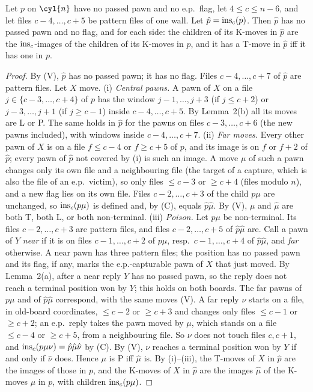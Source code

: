 \begin{wlemma}
Let $p$ on $\cyl{n}$ have no passed pawn and no e.p.\ flag, let $4\le c\le n-6$, and let files $c-4,\dots,c+5$ be pattern files of one
wall. Let $\hat p=\operatorname{ins}_c(p)$. Then $\hat p$ has no passed pawn and no flag, and for each side: the children of its K-moves in $\hat p$ are
the $\operatorname{ins}_c$-images of the children of its K-moves in $p$, and it has a T-move in $\hat p$ iff it has one in $p$.
\end{wlemma}
\begin{proof}
By (V), $\hat p$ has no passed pawn; it has no flag. Files $c-4,\dots,c+7$ of $\hat p$ are pattern files. Let $X$ move.
(i) \emph{Central pawns.} A pawn of $X$ on a file $j\in\{c-3,\dots,c+4\}$ of $p$ has the window $j-1,\dots,j+3$ (if $j\le c+2$) or
$j-3,\dots,j+1$ (if $j\ge c-1$) inside $c-4,\dots,c+5$. By Lemma~2(b) all its moves are L or P. The same holds in $\hat p$ for the pawns on
files $c-3,\dots,c+6$ (the new pawns included), with windows inside $c-4,\dots,c+7$.
(ii) \emph{Far moves.} Every other pawn of $X$ is on a file $f\le c-4$ or $f\ge c+5$ of $p$, and its image is on $f$ or $f+2$ of $\hat p$;
every pawn of $\hat p$ not covered by (i) is such an image. A move $\mu$ of such a pawn changes only its own file and a neighbouring
file (the target of a capture, which is also the file of an e.p.\ victim), so only files $\le c-3$ or $\ge c+4$ (files modulo $n$), and a new
flag lies on its own file. Files $c-2,\dots,c+3$ of the child $p\mu$ are unchanged, so $\operatorname{ins}_c(p\mu)$ is defined and, by (C), equals $\hat p\hat\mu$.
By (V), $\mu$ and $\hat\mu$ are both T, both L, or both non-terminal.
(iii) \emph{Poison.} Let $p\mu$ be non-terminal. Its files $c-2,\dots,c+3$ are pattern files, and files $c-2,\dots,c+5$ of $\hat p\hat\mu$ are.
Call a pawn of $Y$ \emph{near} if it is on files $c-1,\dots,c+2$ of $p\mu$, resp.\ $c-1,\dots,c+4$ of $\hat p\hat\mu$, and \emph{far} otherwise.
A near pawn has three pattern files; the position has no passed pawn and its flag, if any, marks the e.p.-capturable pawn of $X$ that just moved. By
Lemma~2(a), after a near reply $Y$ has no passed pawn, so the reply does not reach a terminal position won by $Y$; this holds on both boards.
The far pawns of $p\mu$ and of $\hat p\hat\mu$ correspond, with the same moves (V). A far reply $\nu$ starts on a file, in old-board coordinates, $\le c-2$ or $\ge c+3$
and changes only files $\le c-1$ or $\ge c+2$; an e.p.\ reply takes the pawn moved by $\mu$, which stands on a file $\le c-4$ or
$\ge c+5$, from a neighbouring file. So $\nu$ does not touch files $c,c+1$, and $\operatorname{ins}_c(p\mu\nu)=\hat p\hat\mu\hat\nu$ by (C). By (V),
$\nu$ reaches a terminal position won by $Y$ if and only if $\hat\nu$ does. Hence $\mu$ is P iff $\hat\mu$ is.
By (i)--(iii), the T-moves of $X$ in $\hat p$ are the images of those in $p$, and the K-moves of $X$ in $\hat p$ are the images $\hat\mu$ of
the K-moves $\mu$ in $p$, with children $\operatorname{ins}_c(p\mu)$.
\end{proof}

